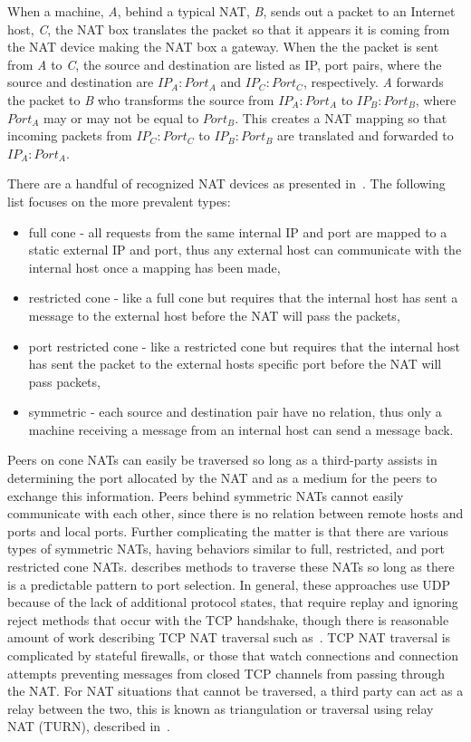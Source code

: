 When a machine, \textit{A}, behind a typical NAT, \textit{B}, sends out a
packet to an Internet host, \textit{C}, the NAT box translates the packet so
that it appears it is coming from the NAT device making the NAT box a gateway.
When the the packet is sent from \textit{A} to \textit{C}, the source and
destination are listed as IP, port pairs, where the source and destination are
$IP_A:Port_A$ and $IP_C:Port_C$, respectively.  \textit{A} forwards the packet
to \textit{B} who transforms the source from $IP_A:Port_A$ to $IP_B:Port_B$,
where $Port_A$ may or may not be equal to $Port_B$.  This creates a NAT mapping
so that incoming packets from $IP_C:Port_C$ to $IP_B:Port_B$ are translated and
forwarded to $IP_A:Port_A$.

There are a handful of recognized NAT devices as presented in~\cite{stun,
p2p_nats_rfc}.  The following list focuses on the more prevalent types:
\begin{itemize}
\item full cone - all requests from the same internal IP and port are mapped to
a static external IP and port, thus any external host can communicate with the
internal host once a mapping has been made,
\item restricted cone - like a full cone but requires that the internal host
has sent a message to the external host before the NAT will pass the packets,
\item port restricted cone - like a restricted cone but requires that the
internal host has sent the packet to the external hosts specific port before the
NAT will pass packets,
\item symmetric - each source and destination pair have no relation, thus only
a machine receiving a message from an internal host can send a message back.
\end{itemize}

Peers on cone NATs can easily be traversed so long as a third-party assists in
determining the port allocated by the NAT and as a medium for the peers to
exchange this information.  Peers behind symmetric NATs cannot easily
communicate with each other, since there is no relation between remote hosts
and ports and local ports.  Further complicating the matter is that there are
various types of symmetric NATs, having behaviors similar to full, restricted,
and port restricted cone NATs.  \cite{ice} describes methods to traverse
these NATs so long as there is a predictable pattern to port selection.  In
general, these approaches use UDP because of the lack of additional protocol
states, that require replay and ignoring reject methods that occur with the TCP
handshake,  though there is reasonable amount of work describing TCP NAT
traversal such as~\cite{tcp_nat}.  TCP NAT traversal is complicated by stateful
firewalls, or those that watch connections and connection attempts preventing
messages from closed TCP channels from passing through the NAT.  For NAT
situations that cannot be traversed, a third party can act as a relay between
the two, this is known as triangulation or traversal using relay NAT (TURN),
described in~\cite{turn}.

